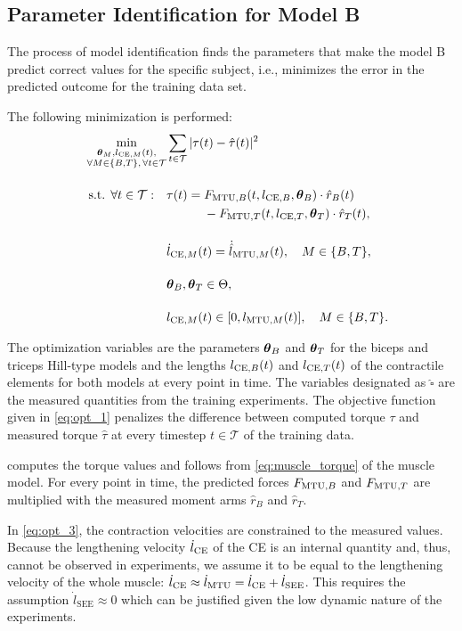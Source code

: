 \subsection{Parameter Identification for Model B}\label{sec:parameter_optimization}
%
The process of model identification finds the parameters that make the model B predict correct values for the specific subject, i.e., minimizes the error in the predicted outcome for the training data set.

The following minimization is performed:
\begin{align}
  &&\min\limits_{\substack{\boldsymbol{\theta}_M,l_{\text{CE},M}(t), \\\forall M \in \{B,T\}, \,\forall t \in \mathcal{T}}} &\sum\limits_{t\in \mathcal{T}}|\tau(t) - \hat{\tau}(t)|^2
   \label{eq:opt_1}\\[4mm]
  &&\text{s.t. }\forall t \in \mathcal{T}:\quad &\tau(t) = F_{\text{MTU},B}(t,l_{\text{CE},B},\boldsymbol{\theta}_B) \cdot \hat{r}_B(t) \notag\\
      &&&\qquad\quad- F_{\text{MTU},T}(t,l_{\text{CE},T},\boldsymbol{\theta}_T) \cdot \hat{r}_T(t),                 \label{eq:opt_2}\\[4mm]
  &&& \dot{l}_{\text{CE},M}(t) = \dot{\hat{l}}_{\text{MTU},M}(t),\quad M \in \{B,T\},      \label{eq:opt_3}\\[4mm]
  &&& \boldsymbol{\theta}_B, \boldsymbol{\theta}_T \in \Theta,                                       \label{eq:opt_4}\\[4mm]
  &&& l_{\text{CE},M}(t) \in [0,l_{\text{MTU},M}(t)],\quad M \in \{B,T\}.                  \label{eq:opt_5}
\end{align}

The optimization variables are the parameters $\boldsymbol{\theta}_B$ and $\boldsymbol{\theta}_T$ for the biceps and triceps Hill-type models and the lengths $l_{\text{CE},B}(t)$ and $l_{\text{CE},T}(t)$ of the contractile elements for both models at every point in time. The variables designated as $\hat{\square}$ are the measured quantities from the training experiments. The objective function given in \cref{eq:opt_1} penalizes the difference between computed torque $\tau$ and measured torque $\hat{\tau}$ at every timestep $t \in \mathcal{T}$ of the training data. 

 computes the torque values and follows from \cref{eq:muscle_torque} of the muscle model. For every point in time, the predicted forces $F_{\text{MTU},B}$ and $F_{\text{MTU},T}$ are multiplied with the measured moment arms $\hat{r}_B$ and $\hat{r}_T$.

In \cref{eq:opt_3}, the contraction velocities are constrained to the measured values. Because the lengthening velocity $\dot{l}_{\text{CE}}$ of the CE is an internal quantity and, thus, cannot be observed in experiments, we assume it to be equal to the lengthening velocity of the whole muscle: $\dot{l}_{\text{CE}} \approx \dot{l}_{\text{MTU}} = \dot{l}_\text{CE} + \dot{l}_\text{SEE}$. This requires the assumption $\dot{l}_{\text{SEE}} \approx 0$ which can be justified given the low dynamic nature of the experiments.

